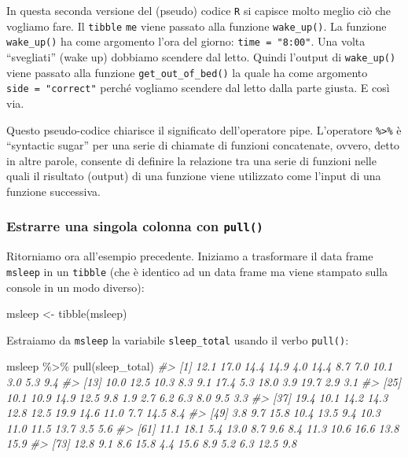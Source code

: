 \documentclass[
  10pt,
  italian,
  a4paper,
  extrafontsizes,onecolumn,openright
  ]{memoir}
\newenvironment{Shaded}{\begin{snugshade}}{\end{snugshade}}
\newcommand{\CommentTok}[1]{\textcolor[rgb]{0.56,0.35,0.01}{\textit{#1}}}
\newcommand{\FunctionTok}[1]{\textcolor[rgb]{0.00,0.00,0.00}{#1}}
\newcommand{\NormalTok}[1]{#1}
\newcommand{\OtherTok}[1]{\textcolor[rgb]{0.56,0.35,0.01}{#1}}
\newcommand{\SpecialCharTok}[1]{\textcolor[rgb]{0.00,0.00,0.00}{#1}}
\begin{document}
In questa seconda versione del (pseudo) codice \texttt{R} si capisce molto meglio ciò che vogliamo fare. Il \texttt{tibble} \texttt{me} viene passato alla funzione \texttt{wake\_up()}. La funzione \texttt{wake\_up()} ha come argomento l'ora del giorno: \texttt{time\ =\ "8:00"}. Una volta ``svegliati'' (wake up) dobbiamo scendere dal letto. Quindi l'output di \texttt{wake\_up()} viene passato alla funzione \texttt{get\_out\_of\_bed()} la quale ha come argomento \texttt{side\ =\ "correct"} perché vogliamo scendere dal letto dalla parte giusta. E così via.

Questo pseudo-codice chiarisce il significato dell'operatore pipe. L'operatore \texttt{\%\textgreater{}\%} è ``syntactic sugar'' per una serie di chiamate di funzioni concatenate, ovvero, detto in altre parole, consente di definire la relazione tra una serie di funzioni nelle quali il risultato (output) di una funzione viene utilizzato come l'input di una funzione successiva.

\hypertarget{estrarre-una-singola-colonna-con-pull}{%
\subsubsection{\texorpdfstring{Estrarre una singola colonna con \texttt{pull()}}{Estrarre una singola colonna con pull()}}\label{estrarre-una-singola-colonna-con-pull}}

Ritorniamo ora all'esempio precedente. Iniziamo a trasformare il data frame \texttt{msleep} in un \texttt{tibble} (che è identico ad un data frame ma viene stampato sulla console in un modo diverso):

\begin{Shaded}
\begin{Highlighting}[]
\NormalTok{msleep }\OtherTok{\textless{}{-}} \FunctionTok{tibble}\NormalTok{(msleep)}
\end{Highlighting}
\end{Shaded}

\noindent 
Estraiamo da \texttt{msleep} la variabile \texttt{sleep\_total} usando il verbo \texttt{pull()}:

\begin{Shaded}
\begin{Highlighting}[]
\NormalTok{msleep }\SpecialCharTok{\%\textgreater{}\%} 
  \FunctionTok{pull}\NormalTok{(sleep\_total)}
\CommentTok{\#\textgreater{}  [1] 12.1 17.0 14.4 14.9  4.0 14.4  8.7  7.0 10.1  3.0  5.3  9.4}
\CommentTok{\#\textgreater{} [13] 10.0 12.5 10.3  8.3  9.1 17.4  5.3 18.0  3.9 19.7  2.9  3.1}
\CommentTok{\#\textgreater{} [25] 10.1 10.9 14.9 12.5  9.8  1.9  2.7  6.2  6.3  8.0  9.5  3.3}
\CommentTok{\#\textgreater{} [37] 19.4 10.1 14.2 14.3 12.8 12.5 19.9 14.6 11.0  7.7 14.5  8.4}
\CommentTok{\#\textgreater{} [49]  3.8  9.7 15.8 10.4 13.5  9.4 10.3 11.0 11.5 13.7  3.5  5.6}
\CommentTok{\#\textgreater{} [61] 11.1 18.1  5.4 13.0  8.7  9.6  8.4 11.3 10.6 16.6 13.8 15.9}
\CommentTok{\#\textgreater{} [73] 12.8  9.1  8.6 15.8  4.4 15.6  8.9  5.2  6.3 12.5  9.8}
\end{Highlighting}
\end{Shaded}
\end{document}
